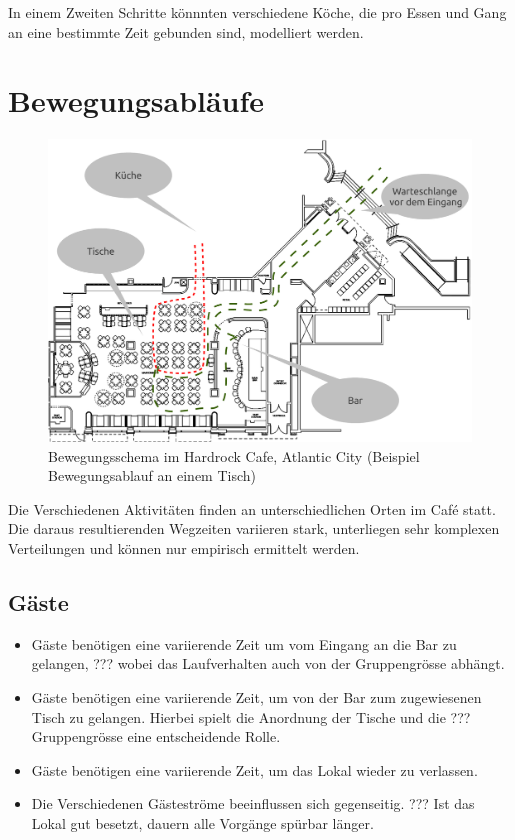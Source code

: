 \documentclass[ngerman,a4paper,12pt]{scrreprt}
\begin{document}
	In einem Zweiten Schritte könnnten verschiedene Köche, die pro Essen und Gang an eine bestimmte Zeit gebunden sind, modelliert werden.


\section{Bewegungsabläufe}
	\begin{figure}[H]
		\centering
			\includegraphics[width=1\textwidth]{img/hardrockSchema.pdf}
			\caption[Bewegungsschema Hardrock]{Bewegungsschema im Hardrock Cafe, Atlantic City (Beispiel Bewegungsablauf an einem Tisch)}
			\label{schemaHardrock}
	\end{figure}

	Die Verschiedenen Aktivitäten finden an unterschiedlichen Orten im Café statt. Die daraus resultierenden Wegzeiten variieren stark, unterliegen sehr komplexen Verteilungen und können nur empirisch ermittelt werden.

	\subsection{Gäste}
		\begin{itemize}
			\item Gäste benötigen eine variierende Zeit um vom Eingang an die Bar zu gelangen, ??? wobei das Laufverhalten auch von der Gruppengrösse abhängt.
			\item Gäste benötigen eine variierende Zeit, um von der Bar zum zugewiesenen Tisch zu gelangen. Hierbei spielt die Anordnung der Tische und die ??? Gruppengrösse eine entscheidende Rolle.
			\item Gäste benötigen eine variierende Zeit, um das Lokal wieder zu verlassen.
			\item Die Verschiedenen Gästeströme beeinflussen sich gegenseitig. ??? Ist das Lokal gut besetzt, dauern alle Vorgänge spürbar länger.
		\end{itemize}
\end{document}

